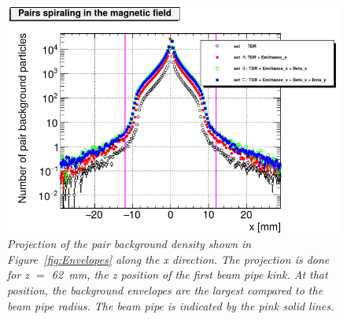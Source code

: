\begin{figure}
\centering
\includegraphics[width=\textwidth]{figures/HelixEnvelope_Projection_Comparison_250GeV_parametersets_NEWSETNAMES.png}
\caption{\textit{Projection of the pair background density shown in Figure~\ref{fig:Envelopes} along the x direction.
The projection is done for z $=$ \SI{62}{\milli\meter}, the z position of the first beam pipe kink.
At that position, the background envelopes are the largest compared to the beam pipe radius.
The beam pipe is indicated by the pink solid lines.}}
\label{fig:Projection_Envelopes}
\end{figure}

